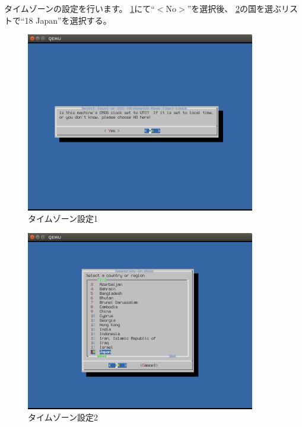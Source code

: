 \documentclass[a4j]{jarticle}
\begin{document}
\begin{multicols}{2}
タイムゾーンの設定を行います。
\ref{fig:FreeBSD_TIM}にて``$<$No$>$''を選択後、
\ref{fig:FreeBSD_TIM2}の国を選ぶリストで``18 Japan''を選択する。
\begin{figure}[htbp]
	\begin{center}
    	\includegraphics[width=10cm]{./IMG/FreeBSD_TIM.png}
	\end{center}
    \caption{タイムゾーン設定1}
    \label{fig:FreeBSD_TIM}
\end{figure}
\begin{figure}[htbp]
	\begin{center}
    	\includegraphics[width=10cm]{./IMG/FreeBSD_TIM_JP.png}
	\end{center}
    \caption{タイムゾーン設定2}
	\label{fig:FreeBSD_TIM2}
\end{figure}


\end{multicols}
\end{document}
